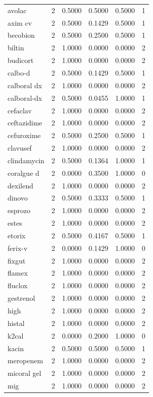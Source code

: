 \begin{longtable}{p{3.0cm}rrrrr}
avolac & 2 & 0.5000 & 0.5000 & 0.5000 & 1 \\
axim cv & 2 & 0.5000 & 0.1429 & 0.5000 & 1 \\
becobion & 2 & 0.5000 & 0.2500 & 0.5000 & 1 \\
biltin & 2 & 1.0000 & 0.0000 & 0.0000 & 2 \\
budicort & 2 & 1.0000 & 0.0000 & 0.0000 & 2 \\
calbo-d & 2 & 0.5000 & 0.1429 & 0.5000 & 1 \\
calboral dx & 2 & 1.0000 & 0.0000 & 0.0000 & 2 \\
calboral-dx & 2 & 0.5000 & 0.0455 & 1.0000 & 1 \\
cefaclav & 2 & 1.0000 & 0.0000 & 0.0000 & 2 \\
ceftazidime & 2 & 1.0000 & 0.0000 & 0.0000 & 2 \\
cefuroxime & 2 & 0.5000 & 0.2500 & 0.5000 & 1 \\
clavusef & 2 & 1.0000 & 0.0000 & 0.0000 & 2 \\
clindamycin & 2 & 0.5000 & 0.1364 & 1.0000 & 1 \\
coralgue d & 2 & 0.0000 & 0.3500 & 1.0000 & 0 \\
dexilend & 2 & 1.0000 & 0.0000 & 0.0000 & 2 \\
dinovo & 2 & 0.5000 & 0.3333 & 0.5000 & 1 \\
esprozo & 2 & 1.0000 & 0.0000 & 0.0000 & 2 \\
estes & 2 & 1.0000 & 0.0000 & 0.0000 & 2 \\
etorix & 2 & 0.5000 & 0.4167 & 0.5000 & 1 \\
ferix-v & 2 & 0.0000 & 0.1429 & 1.0000 & 0 \\
fixgut & 2 & 1.0000 & 0.0000 & 0.0000 & 2 \\
flamex & 2 & 1.0000 & 0.0000 & 0.0000 & 2 \\
fluclox & 2 & 1.0000 & 0.0000 & 0.0000 & 2 \\
gestrenol & 2 & 1.0000 & 0.0000 & 0.0000 & 2 \\
high & 2 & 1.0000 & 0.0000 & 0.0000 & 2 \\
histal & 2 & 1.0000 & 0.0000 & 0.0000 & 2 \\
k2cal & 2 & 0.0000 & 0.2000 & 1.0000 & 0 \\
kacin & 2 & 0.5000 & 0.5000 & 0.5000 & 1 \\
meropenem & 2 & 1.0000 & 0.0000 & 0.0000 & 2 \\
micoral gel & 2 & 1.0000 & 0.0000 & 0.0000 & 2 \\
mig & 2 & 1.0000 & 0.0000 & 0.0000 & 2 \\

\end{longtable}
